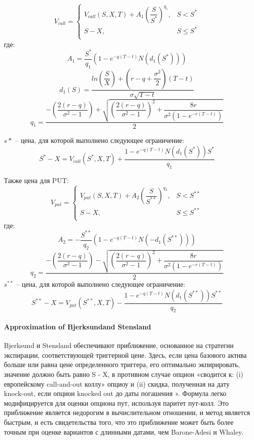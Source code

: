 \documentclass[a4paper]{article}
\begin{document}
\begin{equation*}
    V_{call} = 
    \begin{cases}
        V_{call}(S, X, T) + A_1 \left(\dfrac{S}{S^*} \right)^{q_1}, &S < S^*\\
        S-X, &S \leq S^* \\
    \end{cases}
\end{equation*}
где:
\[A_1 = \dfrac{S^*}{q_1} \left( 1 - e^{-q(T - t)} N(d_1(S^*)) \right)\]
\[d_1(S) = \dfrac{ln \left( \dfrac{S}{X} \right) + (r - q + \dfrac{\sigma^2}{2}) (T-t)}{\sigma \sqrt{T - t}}\]
\[q_1 = \dfrac{ - \left(\dfrac{2 (r - q)}{\sigma^2 - 1 }\right) + \sqrt{ \left(\dfrac{2 (r - q)}{\sigma^2 - 1 }\right)^2 + \dfrac{8r}{\sigma^2 (1 - e^{-r (T-t)})}}}{2}\]

$s*$ -- цена, для которой выполнено следующее ограничение:
\[S^* - X = V_{call}(S^*, X, T) + \dfrac{1 - e^{-q(T - t)} N(d_1(S^*)) S^*}{q_1}\]

Также цена для PUT:
\begin{equation*}
    V_{put} = 
    \begin{cases}
        V_{put}(S, X, T) + A_2 \left(\dfrac{S}{S^{**}} \right)^{q_2}, &S < S^{**}\\
        S-X, &S \leq S^{**} \\
    \end{cases}
\end{equation*}
где:
\[A_2 = -\dfrac{S^{**}}{q_2} \left( 1 - e^{-q(T - t)} N(-d_1(S^{**})) \right)\]
\[q_2 = \dfrac{ - \left(\dfrac{2 (r - q)}{\sigma^2 - 1 }\right) - \sqrt{ \left(\dfrac{2 (r - q)}{\sigma^2 - 1 }\right)^2 + \dfrac{8r}{\sigma^2 (1 - e^{-r (T-t)})}}}{2}\]
$s^{**}$ -- цена, для которой выполнено следующее ограничение:
\[S^{**} - X = V_{put}(S^{**}, X, T) - \dfrac{1 - e^{-q(T - t)} N(d_1(S^{**})) S^{**}}{q_2}\]

\paragraph*{Approximation of Bjerksundand Stensland}
Bjerksund и Stensland обеспечивают приближение, основанное на стратегии экспирации, соответствующей триггерной цене. Здесь, если цена базового актива больше или равна цене определенного триггера, его оптимально экпирировать, значение должно быть равно S - X, в противном случае опцион «сводится к: (i) европейскому call-and-out коллу» опциоу и (ii) скидка, полученная на дату knock-out, если опцион knocked out до даты погашения ». Формула легко модифицируется для оценки опциона пут, используя паритет пут-колл. Это приближение является недорогим в вычислительном отношении, и метод является быстрым, и есть свидетельства того, что это приближение может быть более точным при оценке вариантов с длинными датами, чем Barone-Adesi и Whaley.
\end{document}
